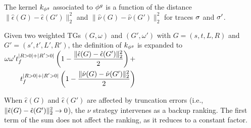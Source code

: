 The kernel $k_{{\phi^{g}}}$ associated to ${\phi^{g}}$ is {a function of the distance  $\|\hat{\epsilon}(G)-\hat{\epsilon}(G')\|_2^2$ and $\|\hat{\nu}(G)-\hat{\nu}(G')\|_2^2$ for traces $\sigma$ and ${{\sigma'}}$.}
%

\begin{proposition}
	\label{lem:rewritinglemma}
	Given {two weighted TGs} $(G,\omega)$ and $(G',\omega')$ with $G=(s,t,L,R)$ and $G'=(s',t',L',R')$, the definition of
	$k_{\phi^{g}}$ is expanded to
	$\begin{aligned}
	 \omega\omega't_f^{|R>0|+|R'>0|}\left(1-\frac{\|\hat{\epsilon}(G)-\hat{\epsilon}(G')\|_{2}^2}{2}\right)+\\t_f^{|R>0|+|R'>0|}\left(1-\frac{\|\hat{\nu}(G)-\hat{\nu}(G')\|_{2}^2}{2}\right)
	\end{aligned}$
\end{proposition}

When $\hat{\epsilon}(G)$ and $\hat{\epsilon}(G')$ are affected by truncation errors
(i.e., $\|\hat{\epsilon}(G)-\hat{\epsilon}(G')\|_{2}^2\to 0$), the $\nu$ strategy intervenes as a backup ranking. The first
term of the sum does not affect the ranking, as it reduces to a constant factor.

%





